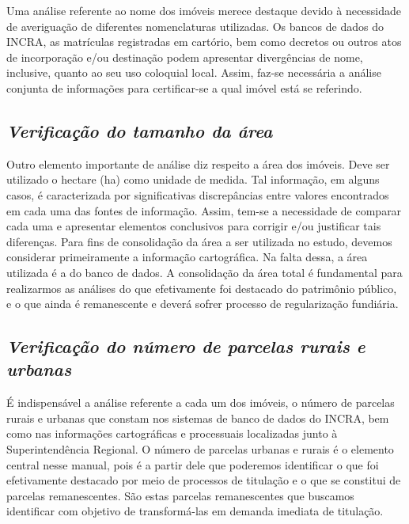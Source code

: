 \documentclass[
  letterpaper,
]{report}
\begin{document}
Uma análise referente ao nome dos imóveis merece destaque devido à
necessidade de averiguação de diferentes nomenclaturas utilizadas. Os
bancos de dados do INCRA, as matrículas registradas em cartório, bem
como decretos ou outros atos de incorporação e/ou destinação podem
apresentar divergências de nome, inclusive, quanto ao seu uso coloquial
local. Assim, faz-se necessária a análise conjunta de informações para
certificar-se a qual imóvel está se referindo.

\hypertarget{verificauxe7uxe3o-do-tamanho-da-uxe1rea}{%
\subsection{\texorpdfstring{\emph{Verificação do tamanho da
área}}{Verificação do tamanho da área}}\label{verificauxe7uxe3o-do-tamanho-da-uxe1rea}}

Outro elemento importante de análise diz respeito a área dos imóveis.
Deve ser utilizado o hectare (ha) como unidade de medida. Tal
informação, em alguns casos, é caracterizada por significativas
discrepâncias entre valores encontrados em cada uma das fontes de
informação. Assim, tem-se a necessidade de comparar cada uma e
apresentar elementos conclusivos para corrigir e/ou justificar tais
diferenças. Para fins de consolidação da área a ser utilizada no estudo,
devemos considerar primeiramente a informação cartográfica. Na falta
dessa, a área utilizada é a do banco de dados. A consolidação da área
total é fundamental para realizarmos as análises do que efetivamente foi
destacado do patrimônio público, e o que ainda é remanescente e deverá
sofrer processo de regularização fundiária.

\hypertarget{verificauxe7uxe3o-do-nuxfamero-de-parcelas-rurais-e-urbanas}{%
\subsection{\texorpdfstring{\emph{Verificação do número de parcelas
rurais e
urbanas}}{Verificação do número de parcelas rurais e urbanas}}\label{verificauxe7uxe3o-do-nuxfamero-de-parcelas-rurais-e-urbanas}}

É indispensável a análise referente a cada um dos imóveis, o número de
parcelas rurais e urbanas que constam nos sistemas de banco de dados do
INCRA, bem como nas informações cartográficas e processuais localizadas
junto à Superintendência Regional. O número de parcelas urbanas e rurais
é o elemento central nesse manual, pois é a partir dele que poderemos
identificar o que foi efetivamente destacado por meio de processos de
titulação e o que se constitui de parcelas remanescentes. São estas
parcelas remanescentes que buscamos identificar com objetivo de
transformá-las em demanda imediata de titulação.
\end{document}

